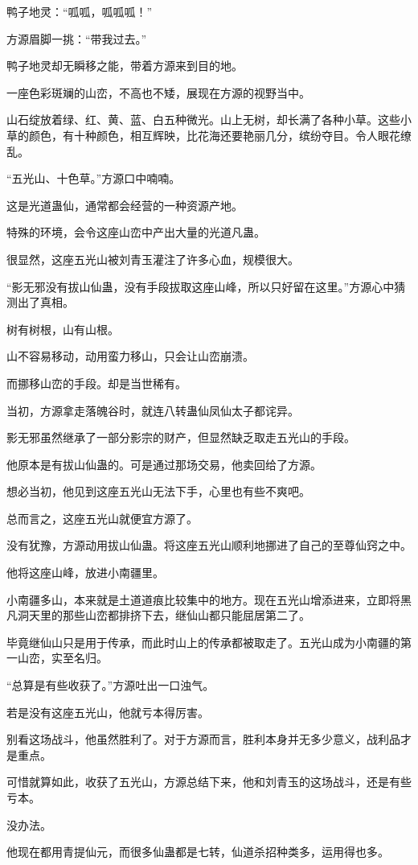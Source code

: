 \begin{this_body}
鸭子地灵：“呱呱，呱呱呱！”

方源眉脚一挑：“带我过去。”

鸭子地灵却无瞬移之能，带着方源来到目的地。

一座色彩斑斓的山峦，不高也不矮，展现在方源的视野当中。

山石绽放着绿、红、黄、蓝、白五种微光。山上无树，却长满了各种小草。这些小草的颜色，有十种颜色，相互辉映，比花海还要艳丽几分，缤纷夺目。令人眼花缭乱。

“五光山、十色草。”方源口中喃喃。

这是光道蛊仙，通常都会经营的一种资源产地。

特殊的环境，会令这座山峦中产出大量的光道凡蛊。

很显然，这座五光山被刘青玉灌注了许多心血，规模很大。

“影无邪没有拔山仙蛊，没有手段拔取这座山峰，所以只好留在这里。”方源心中猜测出了真相。

树有树根，山有山根。

山不容易移动，动用蛮力移山，只会让山峦崩溃。

而挪移山峦的手段。却是当世稀有。

当初，方源拿走落魄谷时，就连八转蛊仙凤仙太子都诧异。

影无邪虽然继承了一部分影宗的财产，但显然缺乏取走五光山的手段。

他原本是有拔山仙蛊的。可是通过那场交易，他卖回给了方源。

想必当初，他见到这座五光山无法下手，心里也有些不爽吧。

总而言之，这座五光山就便宜方源了。

没有犹豫，方源动用拔山仙蛊。将这座五光山顺利地挪进了自己的至尊仙窍之中。

他将这座山峰，放进小南疆里。

小南疆多山，本来就是土道道痕比较集中的地方。现在五光山增添进来，立即将黑凡洞天里的那些山峦都排挤下去，继仙山都只能屈居第二了。

毕竟继仙山只是用于传承，而此时山上的传承都被取走了。五光山成为小南疆的第一山峦，实至名归。

“总算是有些收获了。”方源吐出一口浊气。

若是没有这座五光山，他就亏本得厉害。

别看这场战斗，他虽然胜利了。对于方源而言，胜利本身并无多少意义，战利品才是重点。

可惜就算如此，收获了五光山，方源总结下来，他和刘青玉的这场战斗，还是有些亏本。

没办法。

他现在都用青提仙元，而很多仙蛊都是七转，仙道杀招种类多，运用得也多。


\end{this_body}
